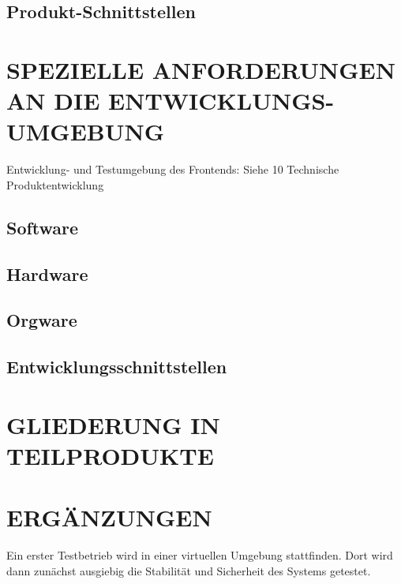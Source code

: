 	\subsection{Produkt-Schnittstellen}
	
	
	\section{\Large SPEZIELLE ANFORDERUNGEN AN DIE ENTWICKLUNGS-UMGEBUNG}
	Entwicklung- und Testumgebung des Frontends: Siehe 10 Technische Produktentwicklung 
	\subsection{Software}
	\subsection{Hardware}
	\subsection{Orgware}
	\subsection{Entwicklungsschnittstellen}
	
	
	\section{\Large GLIEDERUNG IN TEILPRODUKTE}
	
	
	\section{\Large ERGÄNZUNGEN}
	Ein erster Testbetrieb wird in einer virtuellen Umgebung stattfinden. Dort wird dann zunächst ausgiebig die Stabilität und Sicherheit des Systems getestet.
	
	
